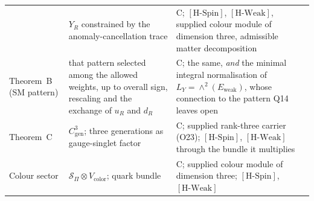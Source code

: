 \documentclass[11pt,a4paper]{article}
\theoremstyle{definition}
\newcommand{\Sbundle}{\mathcal{S}_\Pi}
\newcommand{\Cgen}{C^3_{\mathrm{gen}}}
\newcommand{\Ew}{E_{\mathrm{weak}}}
\newcommand{\HSpin}{\ensuremath{[\mathrm{H\text{-}Spin}]}}
\newcommand{\HWeak}{\ensuremath{[\mathrm{H\text{-}Weak}]}}
\begin{document}
\begin{longtable}[c]{@{}>{\raggedright\arraybackslash}p{3.2cm}
         >{\raggedright\arraybackslash}p{6.0cm} >{\raggedright\arraybackslash}p{4.6cm}@{}}
            & $Y_R$ constrained by the anomaly-cancellation trace
            & C; \HSpin{}, \HWeak{}, supplied colour module of dimension three, admissible matter decomposition \\
          Theorem~B (SM pattern)
            & that pattern selected among the allowed weights, up to overall sign, rescaling and the exchange of
              $u_R$ and $d_R$
            & C; the same, \emph{and} the minimal integral normalisation of $L_Y = \wedge^2(\Ew)$, whose connection
              to the pattern Q14 leaves open \\
          Theorem~C
            & $\Cgen$; three generations as gauge-singlet factor
            & C; supplied rank-three carrier (O23); \HSpin{}, \HWeak{} through the bundle it multiplies \\
          Colour sector
            & $\Sbundle \otimes V_{\mathrm{color}}$; quark bundle
            & C; supplied colour module of dimension three; \HSpin{}, \HWeak{} \\
          \bottomrule
        \end{longtable}
\end{document}
